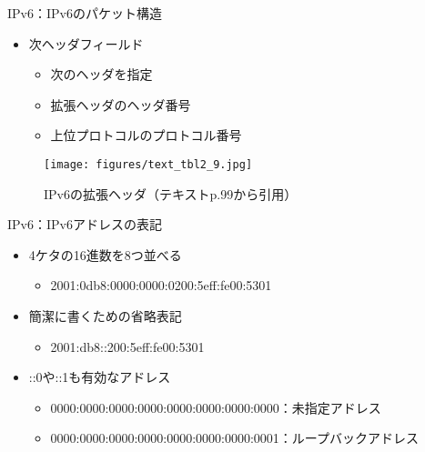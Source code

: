 \documentclass[12pt,aspectratio=169]{beamer}
\begin{document}
\begin{frame}{IPv6：IPv6のパケット構造}

  \begin{minipage}{0.48\textwidth}
    \small
    \begin{itemize}
      \item 次ヘッダフィールド
      \begin{itemize}
        \item 次のヘッダを指定
        \item 拡張ヘッダのヘッダ番号
        \item 上位プロトコルのプロトコル番号
      \end{itemize}
    \end{itemize}

  \end{minipage}
  \hfill
  \begin{minipage}{0.48\textwidth}
    \vspace{-1\baselineskip}
    \centering
    \begin{figure}
      \centering
      \texttt{[image: figures/text\_tbl2\_9.jpg]}
      \label{fig:text_tbl2_9}
      \caption{IPv6の拡張ヘッダ（テキストp.99から引用）}
    \end{figure}
  \end{minipage}

\end{frame}

\begin{frame}{IPv6：IPv6アドレスの表記}

  \begin{itemize}
    \item 4ケタの16進数を8つ並べる
    \begin{itemize}
      \item 2001:0db8:0000:0000:0200:5eff:fe00:5301
    \end{itemize}
    \item 簡潔に書くための省略表記
    \begin{itemize}
      \item 2001:db8::200:5eff:fe00:5301
    \end{itemize}
    \item ::0や::1も有効なアドレス
    \begin{itemize}
      \item 0000:0000:0000:0000:0000:0000:0000:0000：未指定アドレス
      \item 0000:0000:0000:0000:0000:0000:0000:0001：ループバックアドレス
    \end{itemize}
  \end{itemize}

\end{frame}
\end{document}
